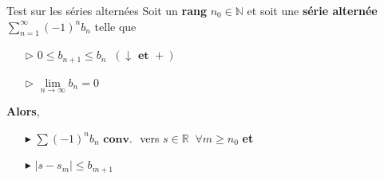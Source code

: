 \documentclass[16pt]{report}
\begin{document}
\begin{multicols*}{2}
     \begin{Theorem}{Test sur les séries alternées}{}
         Soit un \textbf{rang} $n_0 \in \mathbb{N}$ et 
         soit une \textbf{série alternée} 
         $\sum_{n=1}^{\infty } (-1)^nb_n$ telle que 
         \begin{itemize}
            \item[$\rhd$]  $0 \leq b_{n+1} \leq b_n \;\;(\downarrow \textbf{ et } +)$ 
            \item[$\rhd$] $\lim\limits_{n\to\infty }b_n = 0$ 
         \end{itemize}
         \textbf{Alors}, 
         \begin{itemize}
             \item[$\blacktriangleright$]
         $\sum  (-1)^nb_n \textbf{ conv. }$ vers $s \in
         \mathbb{R} \;\; \forall 
         m \geq n_0 $ \textbf{et}  
            \item[$\blacktriangleright$] 
        $|s - s_m| \leq b_{m+1}$
         \end{itemize}        
     \end{Theorem}

\end{multicols*}
\end{document}
